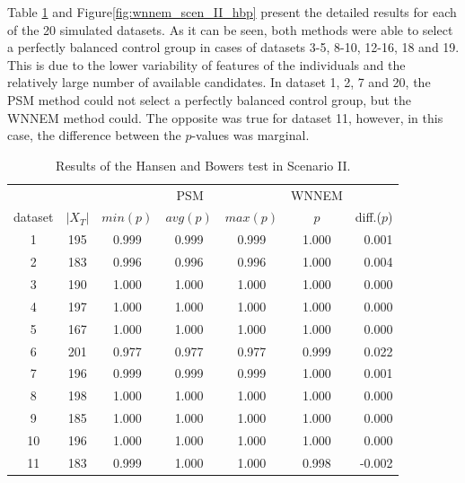 		Table \ref{tab:wnnem_scen_II_stat_separated} and Figure\ref{fig:wnnem_scen_II_hbp} present the detailed results for each of the 20 simulated datasets. As it can be seen, both methods were able to select a perfectly balanced control group in cases of datasets 3-5, 8-10, 12-16, 18 and 19. This is due to the lower variability of features of the individuals and the relatively large number of available candidates. In dataset 1, 2, 7 and 20, the PSM method could not select a perfectly balanced control group, but the WNNEM method could. The opposite was true for dataset 11, however, in this case, the difference between the $p$-values was marginal.       
								
		\begin{table}[h]
			\caption{Results of the Hansen and Bowers test in Scenario II. %
			}
			\label{tab:wnnem_scen_II_stat_separated}
			\centering
			\begin{tabular}{ccccccr} 
				\toprule
				& & \multicolumn{3}{c}{PSM}
				& WNNEM & \\
				dataset & $|X_T|$ & $min (p)$ & $avg (p)$ & $max (p)$ & $p$   & diff.($p$) \\
				\midrule
				1       & 195     & 0.999     & 0.999     & 0.999     & 1.000 & 0.001      \\
				2       & 183     & 0.996     & 0.996     & 0.996     & 1.000 & 0.004      \\
				3       & 190     & 1.000     & 1.000     & 1.000     & 1.000 & 0.000      \\
				4       & 197     & 1.000     & 1.000     & 1.000     & 1.000 & 0.000      \\
				5       & 167     & 1.000     & 1.000     & 1.000     & 1.000 & 0.000      \\
				6       & 201     & 0.977     & 0.977     & 0.977     & 0.999 & 0.022      \\
				7       & 196     & 0.999     & 0.999     & 0.999     & 1.000 & 0.001      \\
				8       & 198     & 1.000     & 1.000     & 1.000     & 1.000 & 0.000      \\
				9       & 185     & 1.000     & 1.000     & 1.000     & 1.000 & 0.000      \\
				10      & 196     & 1.000     & 1.000     & 1.000     & 1.000 & 0.000      \\
				11      & 183     & 0.999     & 1.000     & 1.000     & 0.998 & -0.002     \\

\end{tabular}
\end{table}
